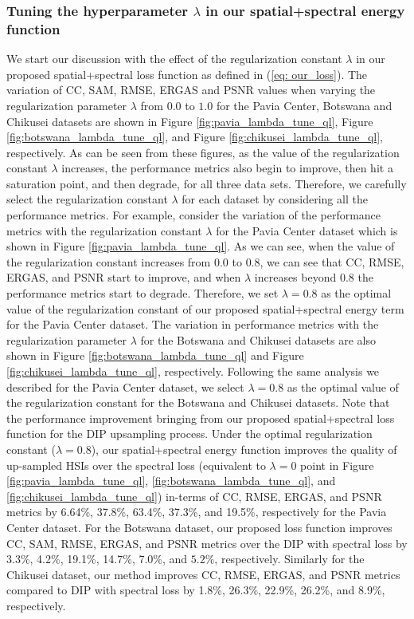 \documentclass[journal]{IEEEtran}
\begin{document}
    \subsubsection{Tuning the hyperparameter $\lambda$ in our spatial+spectral energy function} 
    \par We start our discussion with the effect of the regularization constant $\lambda$ in our proposed spatial+spectral loss function as defined in (\ref{eq: our_loss}). The variation of CC, SAM, RMSE, ERGAS and PSNR values when varying the regularization parameter $\lambda$ from $0.0$ to $1.0$ for the Pavia Center, Botswana and Chikusei datasets are shown in Figure \ref{fig:pavia_lambda_tune_ql}, Figure \ref{fig:botswana_lambda_tune_ql}, and Figure \ref{fig:chikusei_lambda_tune_ql}, respectively. As can be seen from these figures, as the value of the regularization constant $\lambda$ increases, the performance metrics also begin to improve, then hit a saturation point, and then degrade, for all three data sets. Therefore, we carefully select the regularization constant $\lambda$ for each dataset by considering all the performance metrics. For example, consider the variation of the performance metrics with the regularization constant $\lambda$ for the Pavia Center dataset which is shown in Figure \ref{fig:pavia_lambda_tune_ql}. As we can see, when the value of the regularization constant increases from $0.0$ to $0.8$, we can see that CC, RMSE, ERGAS, and PSNR start to improve, and when $\lambda$ increases beyond $0.8$ the performance metrics start to degrade. Therefore, we set $\lambda = 0.8$ as the optimal value of the regularization constant of our proposed spatial+spectral energy term for the Pavia Center dataset. The variation in performance metrics with the regularization parameter $\lambda$ for the Botswana and Chikusei datasets are also shown in Figure \ref{fig:botswana_lambda_tune_ql} and Figure \ref{fig:chikusei_lambda_tune_ql}, respectively. Following the same analysis we described for the Pavia Center dataset, we select $\lambda = 0.8$ as the optimal value of the regularization constant for the Botswana and Chikusei datasets. Note that the performance improvement bringing from our proposed spatial+spectral loss function for the DIP upsampling process. Under the optimal regularization constant ($\lambda = 0.8$), our spatial+spectral energy function improves the quality of up-sampled HSIs over the spectral loss (equivalent to $\lambda = 0$ point in Figure \ref{fig:pavia_lambda_tune_ql}, \ref{fig:botswana_lambda_tune_ql}, and \ref{fig:chikusei_lambda_tune_ql}) in-terms of CC, RMSE, ERGAS, and PSNR metrics by 6.64\%,  37.8\%, 63.4\%, 37.3\%, and 19.5\%, respectively for the Pavia Center dataset. For the Botswana dataset, our proposed loss function improves CC, SAM, RMSE, ERGAS, and PSNR metrics over the DIP with spectral loss by 3.3\%,  4.2\%, 19.1\%, 14.7\%, 7.0\%, and $5.2\%$, respectively. Similarly for the Chikusei dataset, our method improves CC, RMSE, ERGAS, and PSNR metrics compared to  DIP with spectral loss by 1.8\%,  26.3\%, 22.9\%, 26.2\%, and 8.9\%, respectively.
    
\end{document}

